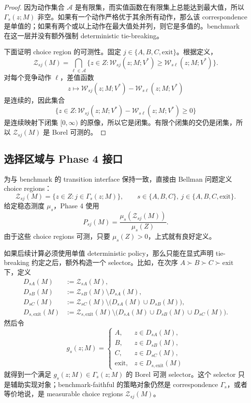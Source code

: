 \begin{proof}
因为动作集合 $\mathcal A$ 是有限集，而实值函数在有限集上总能达到最大值，所以 $\Gamma_s(z;M)$ 非空。如果有一个动作严格优于其余所有动作，那么该 correspondence 是单值的；如果有两个或以上动作在最大值处并列，则它是多值的。benchmark 在这一层并没有额外强制 deterministic tie-breaking。

下面证明 choice region 的可测性。固定 $j\in\{A,B,C,\mathrm{exit}\}$。根据定义，
\[
\mathcal Z_{sj}(M)
=
\bigcap_{\ell\in\mathcal A}
\{z\in Z:\mathcal W_{sj}(z;M;V^*)\ge \mathcal W_{s\ell}(z;M;V^*)\}.
\]
对每个竞争动作 $\ell$，差值函数
\[
z\mapsto \mathcal W_{sj}(z;M;V^*)-\mathcal W_{s\ell}(z;M;V^*)
\]
是连续的，因此集合
\[
\{z\in Z:\mathcal W_{sj}(z;M;V^*)-\mathcal W_{s\ell}(z;M;V^*)\ge 0\}
\]
是连续映射下闭集 $[0,\infty)$ 的原像，所以它是闭集。有限个闭集的交仍是闭集，所以 $\mathcal Z_{sj}(M)$ 是 Borel 可测的。
\end{proof}

\subsection{选择区域与 Phase 4 接口}

为与 benchmark 的 transition interface 保持一致，直接由 Bellman 问题定义 choice regions：
\[
\mathcal Z_{sj}(M)=\{z\in Z:j\in\Gamma_s(z;M)\},
\qquad s\in\{A,B,C\},\ j\in\{A,B,C,\mathrm{exit}\}.
\]
给定稳态测度 $\mu_s$，Phase 4 使用
\[
P_{sj}(M)=\frac{\mu_s(\mathcal Z_{sj}(M))}{\mu_s(Z)}.
\]
由于这些 choice regions 可测，只要 $\mu_s(Z)>0$，上式就有良好定义。

如果后续计算必须使用单值 deterministic policy，那么只能在显式声明 tie-breaking 约定之后，额外构造一个 selector。比如，在次序 $A\succ B\succ C\succ \mathrm{exit}$ 下，定义
\begin{align*}
D_{sA}(M)&:=\mathcal Z_{sA}(M),\\
D_{sB}(M)&:=\mathcal Z_{sB}(M)\setminus D_{sA}(M),\\
D_{sC}(M)&:=\mathcal Z_{sC}(M)\setminus\bigl(D_{sA}(M)\cup D_{sB}(M)\bigr),\\
D_{s,\mathrm{exit}}(M)&:=\mathcal Z_{s,\mathrm{exit}}(M)\setminus\bigl(D_{sA}(M)\cup D_{sB}(M)\cup D_{sC}(M)\bigr).
\end{align*}
然后令
\[
g_s(z;M)=
\begin{cases}
A, & z\in D_{sA}(M),\\
B, & z\in D_{sB}(M),\\
C, & z\in D_{sC}(M),\\
\mathrm{exit}, & z\in D_{s,\mathrm{exit}}(M)
\end{cases}
\]
就得到一个满足 $g_s(z;M)\in\Gamma_s(z;M)$ 的 Borel 可测 selector。这个 selector 只是辅助实现对象；benchmark-faithful 的策略对象仍然是 correspondence $\Gamma_s$，或者等价地说，是 measurable choice regions $\mathcal Z_{sj}(M)$。

